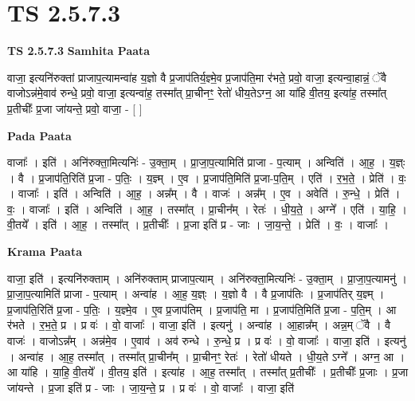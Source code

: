 \documentclass[17pt]{extarticle}
\begin{document}
\section{ TS 2.5.7.3 }

\textbf{TS 2.5.7.3 } \newline
\textbf{Samhita Paata} \newline

वाजा॒ इत्यनि॑रुक्तां प्राजाप॒त्यामन्वा॑ह य॒ज्ञो वै प्र॒जाप॑तिर्य॒ज्ञ्मे॒व प्र॒जाप॑ति॒मा र॑भते॒ प्रवो॒ वाजा॒ इत्यन्वा॒हान्नं॒ ॅवै वाजोऽन्न॑मे॒वाव॑ रुन्धे॒ प्रवो॒ वाजा॒ इत्यन्वा॑ह॒ तस्मा᳚त् प्रा॒चीनꣳ॒॒ रेतो॑ धीय॒तेऽग्न॒ आ या॑हि वी॒तय॒ इत्या॑ह॒ तस्मा᳚त् प्र॒तीचीः᳚ प्र॒जा जा॑यन्ते॒ प्रवो॒ वाजा॒ - [  ] \newline

\textbf{Pada Paata} \newline

वाजाः᳚ । इति॑ । अनि॑रुक्ता॒मित्यनिः॑ - उ॒क्ता॒म् । प्रा॒जा॒प॒त्यामिति॑ प्राजा - प॒त्याम् । अन्विति॑ । आ॒ह॒ । य॒ज्ञ्ः । वै । प्र॒जाप॑ति॒रिति॑ प्र॒जा - प॒तिः॒ । य॒ज्ञ्म् । ए॒व । प्र॒जाप॑ति॒मिति॑ प्र॒जा-प॒ति॒म् । एति॑ । र॒भ॒ते॒ । प्रेति॑ । वः॒ । वाजाः᳚ । इति॑ । अन्विति॑ । आ॒ह॒ । अन्न᳚म् । वै । वाजः॑ । अन्न᳚म् । ए॒व । अवेति॑ । रु॒न्धे॒ । प्रेति॑ । वः॒ । वाजाः᳚ । इति॑ । अन्विति॑ । आ॒ह॒ । तस्मा᳚त् । प्रा॒चीन᳚म् । रेतः॑ । धी॒य॒ते॒ । अग्ने᳚ । एति॑ । या॒हि॒ । वी॒तये᳚ । इति॑ । आ॒ह॒ । तस्मा᳚त् । प्र॒तीचीः᳚ । प्र॒जा इति॑ प्र - जाः । जा॒य॒न्ते॒ । प्रेति॑ । वः॒ । वाजाः᳚ ।  \newline


\textbf{Krama Paata} \newline

वाजा॒ इति॑ । इत्यनि॑रुक्ताम् । अनि॑रुक्ताम् प्राजाप॒त्याम् । अनि॑रुक्ता॒मित्यनिः॑ - उ॒क्ता॒म् । प्रा॒जा॒प॒त्यामनु॑ । प्रा॒जा॒प॒त्यामिति॑ प्राजा - प॒त्याम् । अन्वा॑ह । आ॒ह॒ य॒ज्ञ्ः । य॒ज्ञो वै । वै प्र॒जाप॑तिः । प्र॒जाप॑तिर् य॒ज्ञ्म् । प्र॒जाप॑ति॒रिति॑ प्र॒जा - प॒तिः॒ । य॒ज्ञ्मे॒व । ए॒व प्र॒जाप॑तिम् । प्र॒जाप॑ति॒ मा । प्र॒जाप॑ति॒मिति॑ प्र॒जा - प॒ति॒म् । आ र॑भते । र॒भ॒ते॒ प्र । प्र वः॑ । वो॒ वाजाः᳚ । वाजा॒ इति॑ । इत्यनु॑ । अन्वा॑ह । आ॒हान्न᳚म् । अन्न॒म् ॅवै । वै वाजः॑ । वाजोऽन्न᳚म् । अन्न॑मे॒व । ए॒वाव॑ । अव॑ रुन्धे । रु॒न्धे॒ प्र । प्र वः॑ । वो॒ वाजाः᳚ । वाजा॒ इति॑ । इत्यनु॑ । अन्वा॑ह । आ॒ह॒ तस्मा᳚त् । तस्मा᳚त् प्रा॒चीन᳚म् । प्रा॒चीनꣳ॒॒ रेतः॑ । रेतो॑ धीयते । धी॒य॒ते ऽग्ने᳚ । अग्न॒ आ । आ या॑हि । या॒हि॒ वी॒तये᳚ । वी॒तय॒ इति॑ । इत्या॑ह । आ॒ह॒ तस्मा᳚त् । तस्मा᳚त् प्र॒तीचीः᳚ । प्र॒तीचीः᳚ प्र॒जाः । प्र॒जा जा॑यन्ते । प्र॒जा इति॑ प्र - जाः । जा॒य॒न्ते॒ प्र । प्र वः॑ । वो॒ वाजाः᳚ । वाजा॒ इति॑ \newline
\end{document}

